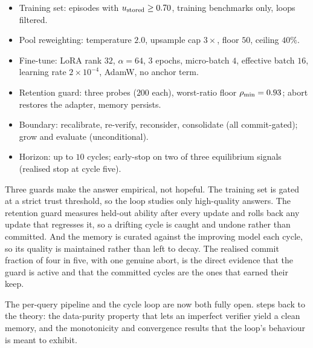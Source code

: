 \begin{bythenumbers}
\begin{itemize}[leftmargin=1.3em, itemsep=1pt]
  \item Training set: episodes with $u_{\text{stored}} \ge 0.70$, training benchmarks only, loops filtered.
  \item Pool reweighting: temperature $2.0$, upsample cap $3\times$, floor $50$, ceiling $40\%$.
  \item Fine-tune: LoRA rank $32$, $\alpha = 64$, $3$ epochs, micro-batch $4$, effective batch $16$, learning rate $2\times10^{-4}$, AdamW, no anchor term.
  \item Retention guard: three probes ($200$ each), worst-ratio floor $\rho_{\min} = 0.93$; abort restores the adapter, memory persists.
  \item Boundary: recalibrate, re-verify, reconsider, consolidate (all commit-gated); grow and evaluate (unconditional).
  \item Horizon: up to $10$ cycles; early-stop on two of three equilibrium signals (realised stop at cycle five).
\end{itemize}
\end{bythenumbers}

\begin{defence}
Three guards make the answer empirical, not hopeful. The training set is gated at a strict
trust threshold, so the loop studies only high-quality answers. The retention guard
measures held-out ability after every update and rolls back any update that regresses it,
so a drifting cycle is caught and undone rather than committed. And the memory is curated
against the improving model each cycle, so its quality is maintained rather than left to
decay. The realised commit fraction of four in five, with one genuine abort, is the direct
evidence that the guard is active and that the committed cycles are the ones that earned
their keep.
\end{defence}

The per-query pipeline and the cycle loop are now both fully open.  steps
back to the theory: the data-purity property that lets an imperfect verifier yield a
clean memory, and the monotonicity and convergence results that the loop's behaviour is
meant to exhibit.
